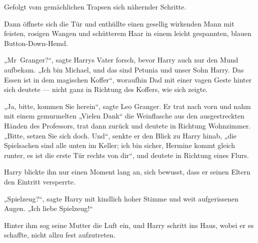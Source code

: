 Gefolgt vom gemächlichen Trapsen sich nähernder Schritte.

Dann öffnete sich die Tür und enthüllte einen gesellig wirkenden Mann mit feisten, rosigen Wangen und schütterem Haar in einem leicht gespannten, blauen Button-Down-Hemd.

„Mr~Granger?“, sagte Harrys Vater forsch, bevor Harry auch nur den Mund aufbekam.
„Ich bin Michael, und das sind Petunia und unser Sohn Harry. Das Essen ist in dem magischen Koffer“, woraufhin Dad mit einer vagen Geste hinter sich deutete — nicht ganz in Richtung des Koffers, wie sich zeigte.

„Ja, bitte, kommen Sie herein“, sagte Leo Granger. Er trat nach vorn und nahm mit einem gemurmelten „Vielen Dank“ die Weinflasche aus den ausgestreckten Händen des Professors, trat dann zurück und deutete in Richtung Wohnzimmer.
„Bitte, setzen Sie sich doch. Und“, senkte er den Blick zu Harry hinab, „die Spielsachen sind alle unten im Keller; ich bin sicher, Hermine kommt gleich runter, es ist die erste Tür rechts von dir“, und deutete in Richtung eines Flurs.

Harry blickte ihn nur einen Moment lang an, sich bewusst, dass er seinen Eltern den Eintritt versperrte.

„Spielzeug?“, sagte Harry mit kindlich hoher Stimme und weit aufgerissenen Augen.
„Ich liebe Spielzeug!“

Hinter ihm sog seine Mutter die Luft ein, und Harry schritt ins Haus, wobei er es schaffte, nicht allzu fest aufzutreten.


